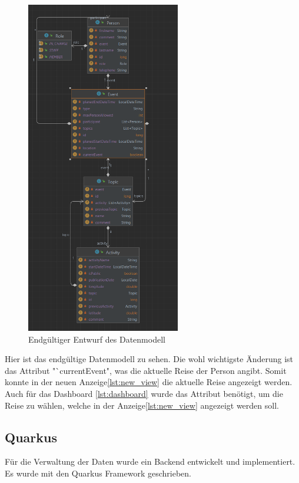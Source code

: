 \begin{figure}[H]
    \centering
    \includegraphics[width=0.6\textwidth]{pics/datenmodell_2.png}
    \caption{Endgültiger Entwurf des Datenmodell}
    \label{fig:datenmodell_Last}
\end{figure}

Hier ist das endgültige Datenmodell zu sehen. Die wohl wichtigste Änderung ist das Attribut "`currentEvent", was die aktuelle Reise der Person angibt. Somit konnte in der neuen Anzeige\ref{lst:new_view} die aktuelle Reise angezeigt werden. Auch für das Dashboard \ref{lst:dashboard} wurde das Attribut benötigt, um die Reise zu wählen, welche in der Anzeige\ref{lst:new_view} angezeigt werden soll.


\subsection{Quarkus}

Für die Verwaltung der Daten wurde ein Backend entwickelt und implementiert. Es wurde mit den Quarkus Framework geschrieben.


